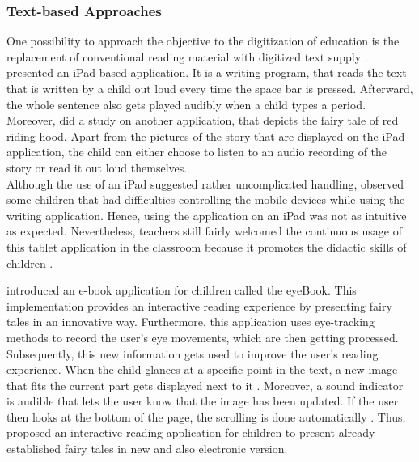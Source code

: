 \subsubsection{Text-based Approaches}
One possibility to approach the objective to the digitization of education is the replacement of conventional reading material with digitized text supply \autocite{walker2000screen, liu2005reading, engen2014ipads}. 
\textcite{engen2014ipads} presented an iPad-based application. It is a writing program, that reads the text that is written by a child out loud every time the space bar is pressed. Afterward, the whole sentence also gets played audibly when a child types a period. \\
Moreover, \textcite{engen2014ipads} did a study on another application, that depicts the fairy tale of red riding hood. Apart from the pictures of the story that are displayed on the iPad application, the child can either choose to listen to an audio recording of the story or read it out loud themselves.\\ 
Although the use of an iPad suggested rather uncomplicated handling, \textcite{engen2014ipads} observed some children that had difficulties controlling the mobile devices while using the writing application. Hence, using the application on an iPad was not as intuitive as expected. 
Nevertheless, teachers still fairly welcomed the continuous usage of this tablet application in the classroom because it promotes the didactic skills of children \autocite{engen2014ipads}. 

\textcite{biedert2010eyebook} introduced an e-book application for children called the eyeBook. This implementation provides an interactive reading experience by presenting fairy tales in an innovative way. 
Furthermore, this application uses eye-tracking methods to record the user's eye movements, which are then getting processed. Subsequently, this new information gets used to improve the user's reading experience. When the child glances at a specific point in the text, a new image that fits the current part gets displayed next to it \autocite{biedert2010eyebook}. Moreover, a sound indicator is audible that lets the user know that the image has been updated. If the user then looks at the bottom of the page, the scrolling is done automatically \autocite{biedert2010eyebook}. Thus, \textcite{biedert2010eyebook} proposed an interactive reading application for children to present already established fairy tales in new and also electronic version. 

